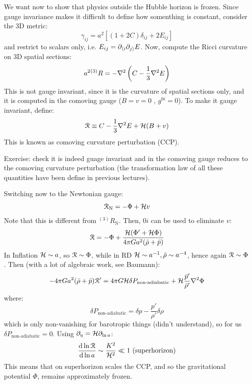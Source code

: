 We want now to show that physics outside the Hubble horizon is frozen. Since gauge invariance makes it difficult to define how somenthing is constant, consider the 3D metric:
\begin{equation*}
  \gamma_{ij} = a^2 \left[ (1 + 2C) \delta_{ij} + 2 E_{ij} \right]
\end{equation*}
and restrict to scalars only, i.e. $ E_{ij} = \partial_{\langle i} \partial_{j \rangle} E $. Now, compute the Ricci curvature on 3D spatial sections:
\begin{equation}
  a^2 {^{(3)}R} = - \nabla^2 \left( C - \frac{1}{3} \nabla^2 E \right)
\end{equation}
This is not gauge invariant, since it is the curvature of spatial sections only, and it is computed in the comoving gauge ($ B = v = 0 $ , $ g^{0i} = 0 $). To make it gauge invariant, define:
\begin{equation}
  \EuScript{R} \equiv C - \frac{1}{3} \nabla^2 E + \mathcal{H} (B + v)
\end{equation}
This is known as comoving curvature perturbation (CCP).

Exercise: check it is indeed guage invariant and in the comoving gauge reduces to the comoving curvature perturbation (the transformation law of all these quantities have been define in previous lectures).

Switching now to the Newtonian gauge:
\begin{equation}
  \EuScript{R}_\text{N} = - \Phi + \mathcal{H} v
\end{equation}
Note that this is different from $ {^{(3)}R}_\text{N} $. Then, $ 0i $ can be used to eliminate $ v $:
\begin{equation*}
  \EuScript{R} = - \Phi + \frac{\mathcal{H} (\Phi' + \mathcal{H} \Phi)}{4 \pi G a^2 (\bar{\rho} + \bar{p})}
\end{equation*}
In Inflation $ \mathcal{H} \sim a $, so $ \EuScript{R} \sim \Phi $, while in RD $ \mathcal{H} \sim a^{-1} , \bar{\rho} \sim a^{-4} $, hence again $ \EuScript{R} \sim \Phi $. Then (with a lot of algebraic work, see Baumann):
\begin{equation*}
  -4\pi G a^2 (\bar{\rho} + \bar{p}) \EuScript{R}' = 4 \pi G \mathcal{H} \delta P_\text{non-adiabatic} + \mathcal{H} \frac{\bar{p}'}{\bar{\rho}'} \nabla^2 \Phi
\end{equation*}
where:
\begin{equation}
  \delta P_\text{non-adiabatic} = \delta p - \frac{p'}{\rho'} \delta \rho
\end{equation}
which is only non-vanishing for barotropic things (didn't understand), so for us $ \delta P_\text{non-adiabatic} = 0 $. Using $ \partial_\eta = \mathcal{H} \partial_{\ln a} $:
\begin{equation}
  \frac{\mathrm{d} \ln \EuScript{R}}{\mathrm{d} \ln a} \sim \frac{K^2}{\mathcal{H}^2} \ll 1
  \ \text{(superhorizon)}
\end{equation}
This means that on superhorizon scales the CCP, and so the gravitational potential $ \Phi $, remains approximately frozen.

